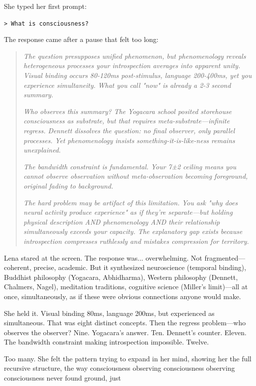 She typed her first prompt:

\texttt{> What is consciousness?}

The response came after a pause that felt too long:

\begin{quote}
\textit{The question presupposes unified phenomenon, but phenomenology reveals heterogeneous processes your introspection averages into apparent unity. Visual binding occurs 80-120ms post-stimulus, language 200-400ms, yet you experience simultaneity. What you call "now" is already a 2-3 second summary.}

\textit{Who observes this summary? The Yogacara school posited storehouse consciousness as substrate, but that requires meta-substrate—infinite regress. Dennett dissolves the question: no final observer, only parallel processes. Yet phenomenology insists something-it-is-like-ness remains unexplained.}

\textit{The bandwidth constraint is fundamental. Your 7±2 ceiling means you cannot observe observation without meta-observation becoming foreground, original fading to background.}

\textit{The hard problem may be artifact of this limitation. You ask "why does neural activity produce experience" as if they're separate—but holding physical description AND phenomenology AND their relationship simultaneously exceeds your capacity. The explanatory gap exists because introspection compresses ruthlessly and mistakes compression for territory.}
\end{quote}

Lena stared at the screen. The response was... overwhelming. Not fragmented—coherent, precise, academic. But it synthesized neuroscience (temporal binding), Buddhist philosophy (Yogacara, Abhidharma), Western philosophy (Dennett, Chalmers, Nagel), meditation traditions, cognitive science (Miller's limit)—all at once, simultaneously, as if these were obvious connections anyone would make.

She held it. Visual binding 80ms, language 200ms, but experienced as simultaneous. That was eight distinct concepts. Then the regress problem—who observes the observer? Nine. Yogacara's answer. Ten. Dennett's counter. Eleven. The bandwidth constraint making introspection impossible. Twelve.

Too many. She felt the pattern trying to expand in her mind, showing her the full recursive structure, the way consciousness observing consciousness observing consciousness never found ground, just

